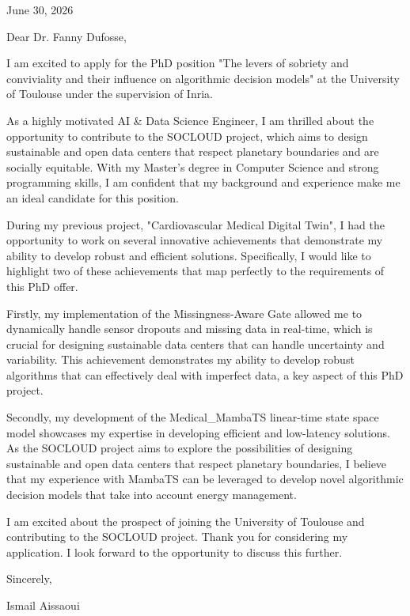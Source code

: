 \documentclass[11pt]{letter}
\begin{document}
\opening{\noindent June 30, 2026}
Dear Dr. Fanny Dufosse,

I am excited to apply for the PhD position "The levers of sobriety and conviviality and their influence on algorithmic decision models" at the University of Toulouse under the supervision of Inria.

As a highly motivated AI & Data Science Engineer, I am thrilled about the opportunity to contribute to the SOCLOUD project, which aims to design sustainable and open data centers that respect planetary boundaries and are socially equitable. With my Master's degree in Computer Science and strong programming skills, I am confident that my background and experience make me an ideal candidate for this position.

During my previous project, "Cardiovascular Medical Digital Twin", I had the opportunity to work on several innovative achievements that demonstrate my ability to develop robust and efficient solutions. Specifically, I would like to highlight two of these achievements that map perfectly to the requirements of this PhD offer.

Firstly, my implementation of the Missingness-Aware Gate allowed me to dynamically handle sensor dropouts and missing data in real-time, which is crucial for designing sustainable data centers that can handle uncertainty and variability. This achievement demonstrates my ability to develop robust algorithms that can effectively deal with imperfect data, a key aspect of this PhD project.

Secondly, my development of the Medical_MambaTS linear-time state space model showcases my expertise in developing efficient and low-latency solutions. As the SOCLOUD project aims to explore the possibilities of designing sustainable and open data centers that respect planetary boundaries, I believe that my experience with MambaTS can be leveraged to develop novel algorithmic decision models that take into account energy management.

I am excited about the prospect of joining the University of Toulouse and contributing to the SOCLOUD project. Thank you for considering my application. I look forward to the opportunity to discuss this further.

Sincerely,

Ismail Aissaoui

\closing{\noindent}
\end{document}
